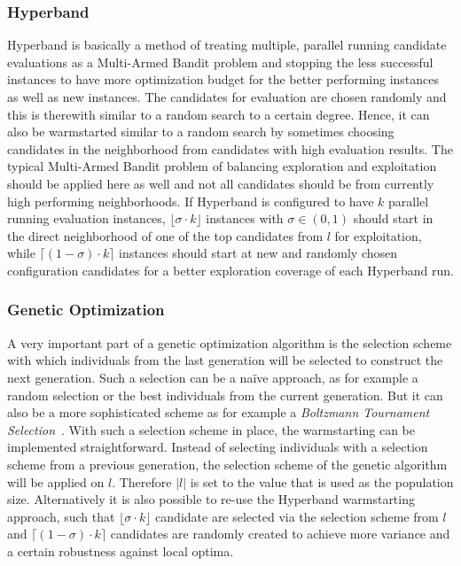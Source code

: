 \subsubsection{Hyperband}
Hyperband is basically a method of treating multiple, parallel running candidate evaluations as a Multi-Armed Bandit problem and stopping the less successful instances to have more optimization budget for the better performing instances as well as new instances.
The candidates for evaluation are chosen randomly and this is therewith similar to a random search to a certain degree.
Hence, it can also be warmstarted similar to a random search by sometimes choosing candidates in the neighborhood from candidates with high evaluation results.\newline
The typical Multi-Armed Bandit problem of balancing exploration and exploitation should be applied here as well and not all candidates should be from currently high performing neighborhoods.
If Hyperband is configured to have $k$ parallel running evaluation instances, $\lfloor \sigma \cdot k \rfloor$ instances with $\sigma \in (0,1)$ should start in the direct neighborhood of one of the top candidates from $l$ for exploitation, while $\lceil (1 - \sigma) \cdot k \rceil$ instances should start at new and randomly chosen configuration candidates for a better exploration coverage of each Hyperband run.

\subsubsection{Genetic Optimization}
A very important part of a genetic optimization algorithm is the selection scheme with which individuals from the last generation will be selected to construct the next generation.
Such a selection can be a na\"ive approach, as for example a random selection or the best individuals from the current generation.
But it can also be a more sophisticated scheme as for example a \textit{Boltzmann Tournament Selection}~\cite{Goldberg-Boltzmann}.\newline
With such a selection scheme in place, the warmstarting can be implemented straightforward.
Instead of selecting individuals with a selection scheme from a previous generation, the selection scheme of the genetic algorithm will be applied on $l$.
Therefore $|l|$ is set to the value that is used as the population size.\newline
Alternatively it is also possible to re-use the Hyperband warmstarting approach, such that $\lfloor \sigma \cdot k \rfloor$ candidate are selected via the selection scheme from $l$ and $\lceil (1 - \sigma) \cdot k \rceil$ candidates are randomly created to achieve more variance and a certain robustness against local optima.


